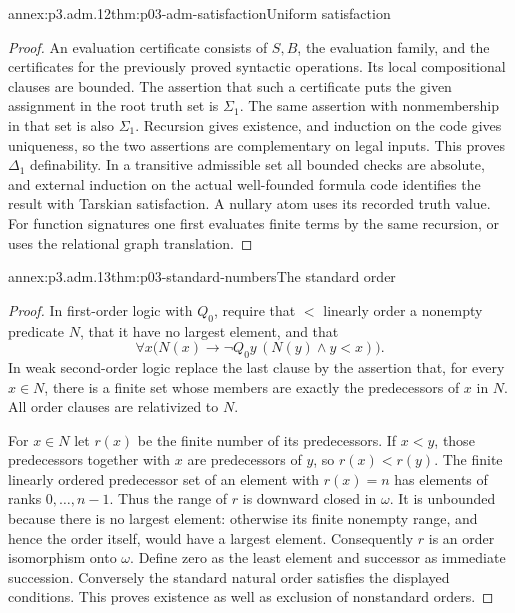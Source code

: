 \begin{annexitem}{annex:p3.adm.12}{thm:p03-adm-satisfaction}{Uniform satisfaction}
\begin{proof}
An evaluation certificate consists of \(S,B\), the evaluation family,
and the certificates for the previously proved syntactic operations.
Its local compositional clauses are bounded. The assertion that such a
certificate puts the given assignment in the root truth set is
\(\Sigma_1\). The same assertion with nonmembership in that set is
also \(\Sigma_1\). Recursion gives existence, and induction on the
code gives uniqueness, so the two assertions are complementary on
legal inputs. This proves \(\Delta_1\) definability. In a transitive
admissible set all bounded checks are absolute, and external induction
on the actual well-founded formula code identifies the result with
Tarskian satisfaction. A nullary atom uses its recorded truth value.
For function signatures one first evaluates finite terms by the same
recursion, or uses the relational graph translation.
\end{proof}
\end{annexitem}

\begin{annexitem}{annex:p3.adm.13}{thm:p03-standard-numbers}{The standard order}
\begin{proof}
In first-order logic with \(Q_0\), require that \(<\) linearly order a
nonempty predicate \(N\), that it have no largest element, and that
\[
 \forall x\bigl(N(x)\to\neg Q_0y\,(N(y)\land y<x)\bigr).
\]
In weak second-order logic replace the last clause by the assertion
that, for every \(x\in N\), there is a finite set whose members are
exactly the predecessors of \(x\) in \(N\). All order clauses are
relativized to \(N\).

For \(x\in N\) let \(r(x)\) be the finite number of its predecessors.
If \(x<y\), those predecessors together with \(x\) are predecessors
of \(y\), so \(r(x)<r(y)\). The finite linearly ordered predecessor
set of an element with \(r(x)=n\) has elements of ranks
\(0,\ldots,n-1\). Thus the range of \(r\) is downward closed in
\(\omega\). It is unbounded because there is no largest element:
otherwise its finite nonempty range, and hence the order itself, would
have a largest element. Consequently \(r\) is an order isomorphism
onto \(\omega\). Define zero as the least element and successor as
immediate succession. Conversely the standard natural order satisfies
the displayed conditions. This proves existence as well as exclusion
of nonstandard orders.
\end{proof}
\end{annexitem}


